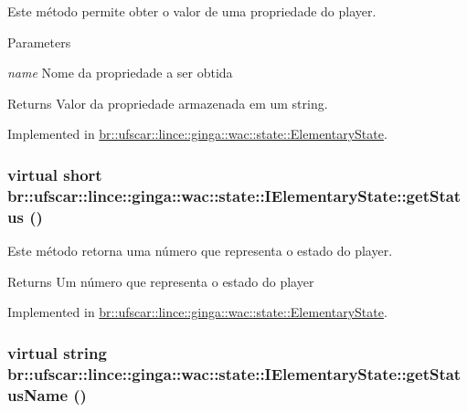 Este método permite obter o valor de uma propriedade do player. 


\begin{DoxyParams}{Parameters}
\item[{\em name}]Nome da propriedade a ser obtida \end{DoxyParams}
\begin{DoxyReturn}{Returns}
Valor da propriedade armazenada em um string. 
\end{DoxyReturn}


Implemented in \hyperlink{classbr_1_1ufscar_1_1lince_1_1ginga_1_1wac_1_1state_1_1ElementaryState_aaa47390c93fda945f7ba5ee80031a137}{br::ufscar::lince::ginga::wac::state::ElementaryState}.

\hypertarget{classbr_1_1ufscar_1_1lince_1_1ginga_1_1wac_1_1state_1_1IElementaryState_a6df6b08801327e6b2c06c428119caba9}{
\subsubsection[{getStatus}]{\setlength{\rightskip}{0pt plus 5cm}virtual short br::ufscar::lince::ginga::wac::state::IElementaryState::getStatus ()}}
\label{classbr_1_1ufscar_1_1lince_1_1ginga_1_1wac_1_1state_1_1IElementaryState_a6df6b08801327e6b2c06c428119caba9}


Este método retorna uma número que representa o estado do player. 

\begin{DoxyReturn}{Returns}
Um número que representa o estado do player 
\end{DoxyReturn}


Implemented in \hyperlink{classbr_1_1ufscar_1_1lince_1_1ginga_1_1wac_1_1state_1_1ElementaryState_a08806ab0fedbb9684ca5a0d1cb42c5ac}{br::ufscar::lince::ginga::wac::state::ElementaryState}.

\hypertarget{classbr_1_1ufscar_1_1lince_1_1ginga_1_1wac_1_1state_1_1IElementaryState_abeabe720e157120f97d6a911460f6d71}{
\subsubsection[{getStatusName}]{\setlength{\rightskip}{0pt plus 5cm}virtual string br::ufscar::lince::ginga::wac::state::IElementaryState::getStatusName ()}}
\label{classbr_1_1ufscar_1_1lince_1_1ginga_1_1wac_1_1state_1_1IElementaryState_abeabe720e157120f97d6a911460f6d71}



